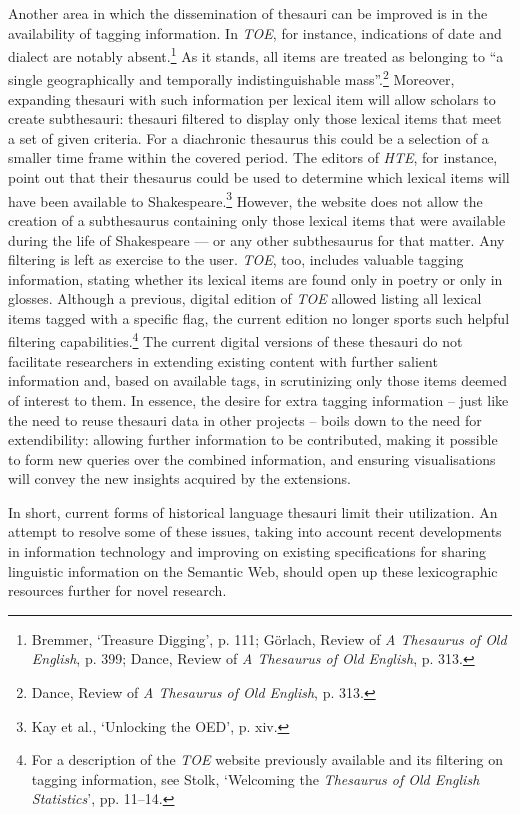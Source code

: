 Another area in which the dissemination of thesauri can be improved is in the availability of tagging information. In \textit{TOE}, for instance, indications of date and dialect are notably absent.\footnote{Bremmer, `Treasure Digging', p. 111; Görlach, Review of \textit{A Thesaurus of Old English}, p. 399; Dance, Review of \textit{A Thesaurus of Old English}, p. 313.} As it stands, all items are treated as belonging to ``a single geographically and temporally indistinguishable mass''.\footnote{Dance, Review of \textit{A Thesaurus of Old English}, p. 313.} Moreover, expanding thesauri with such information per lexical item will allow scholars to create subthesauri: thesauri filtered to display only those lexical items that meet a set of given criteria. For a diachronic thesaurus this could be a selection of a smaller time frame within the covered period. The editors of \textit{HTE}, for instance, point out that their thesaurus could be used to determine which lexical items will have been available to Shakespeare.\footnote{Kay et al., `Unlocking the OED', p. xiv.} However, the website does not allow the creation of a subthesaurus containing only those lexical items that were available during the life of Shakespeare --- or any other subthesaurus for that matter. Any filtering is left as exercise to the user. \textit{TOE}, too, includes valuable tagging information, stating whether its lexical items are found only in poetry or only in glosses. Although a previous, digital edition of \textit{TOE} allowed listing all lexical items tagged with a specific flag, the current edition no longer sports such helpful filtering capabilities.\footnote{For a description of the \textit{TOE} website previously available and its filtering on tagging information, see Stolk, `Welcoming the \textit{Thesaurus of Old English Statistics}', pp. 11–14.} The current digital versions of these thesauri do not facilitate researchers in extending existing content with further salient information and, based on available tags, in scrutinizing only those items deemed of interest to them. In essence, the desire for extra tagging information -- just like the need to reuse thesauri data in other projects -- boils down to the need for extendibility: allowing further information to be contributed, making it possible to form new queries over the combined information, and ensuring visualisations will convey the new insights acquired by the extensions.

In short, current forms of historical language thesauri limit their utilization. An attempt to resolve some of these issues, taking into account recent developments in information technology and improving on existing specifications for sharing linguistic information on the Semantic Web, should open up these lexicographic resources further for novel research.

